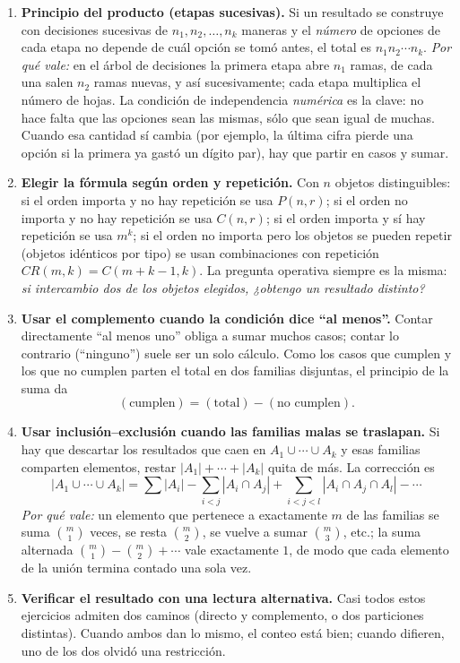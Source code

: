 \documentclass[11pt]{article}
\begin{document}
\begin{teo}
\begin{enumerate}[leftmargin=*]
  \item \textbf{Principio del producto (etapas sucesivas).} Si un resultado se construye con decisiones sucesivas de $n_1,n_2,\dots,n_k$ maneras y el \emph{número} de opciones de cada etapa no depende de cuál opción se tomó antes, el total es $n_1 n_2\cdots n_k$.
  \emph{Por qué vale:} en el árbol de decisiones la primera etapa abre $n_1$ ramas, de cada una salen $n_2$ ramas nuevas, y así sucesivamente; cada etapa multiplica el número de hojas. La condición de independencia \emph{numérica} es la clave: no hace falta que las opciones sean las mismas, sólo que sean igual de muchas. Cuando esa cantidad sí cambia (por ejemplo, la última cifra pierde una opción si la primera ya gastó un dígito par), hay que partir en casos y sumar.

  \item \textbf{Elegir la fórmula según orden y repetición.} Con $n$ objetos distinguibles: si el orden importa y no hay repetición se usa $P(n,r)$; si el orden no importa y no hay repetición se usa $C(n,r)$; si el orden importa y sí hay repetición se usa $m^k$; si el orden no importa pero los objetos se pueden repetir (objetos idénticos por tipo) se usan combinaciones con repetición $CR(m,k)=C(m+k-1,k)$. La pregunta operativa siempre es la misma: \emph{si intercambio dos de los objetos elegidos, ¿obtengo un resultado distinto?}

  \item \textbf{Usar el complemento cuando la condición dice ``al menos''.} Contar directamente ``al menos uno'' obliga a sumar muchos casos; contar lo contrario (``ninguno'') suele ser un solo cálculo. Como los casos que cumplen y los que no cumplen parten el total en dos familias disjuntas, el principio de la suma da
  \[
    (\text{cumplen}) = (\text{total}) - (\text{no cumplen}).
  \]

  \item \textbf{Usar inclusión--exclusión cuando las familias malas se traslapan.} Si hay que descartar los resultados que caen en $A_1\cup\cdots\cup A_k$ y esas familias comparten elementos, restar $|A_1|+\cdots+|A_k|$ quita de más. La corrección es
  \[
    |A_1\cup\cdots\cup A_k|=\sum |A_i|-\sum_{i<j}|A_i\cap A_j|+\sum_{i<j<l}|A_i\cap A_j\cap A_l|-\cdots
  \]
  \emph{Por qué vale:} un elemento que pertenece a exactamente $m$ de las familias se suma $\binom{m}{1}$ veces, se resta $\binom{m}{2}$, se vuelve a sumar $\binom{m}{3}$, etc.; la suma alternada $\binom{m}{1}-\binom{m}{2}+\cdots$ vale exactamente $1$, de modo que cada elemento de la unión termina contado una sola vez.

  \item \textbf{Verificar el resultado con una lectura alternativa.} Casi todos estos ejercicios admiten dos caminos (directo y complemento, o dos particiones distintas). Cuando ambos dan lo mismo, el conteo está bien; cuando difieren, uno de los dos olvidó una restricción.
\end{enumerate}
\end{teo}
\end{document}
